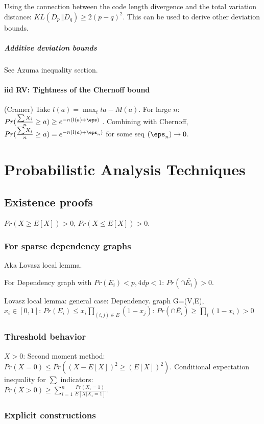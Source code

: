 \documentclass[oneside, article]{memoir}
\begin{document}
Using the connection between the code length divergence and the total variation distance: $KL(D_p||D_q) \geq 2(p-q)^{2}$. This can be used to derive other deviation bounds.

\subsubsection{Additive deviation bounds}
See Azuma inequality section.

\subsection{iid RV: Tightness of the Chernoff bound}
(Cramer) Take $l(a) = \max_{t} ta-M(a)$. For large $n$: $Pr(\frac{\sum X_{i}}{n}\geq a) \geq e^{-n(l(a) + \eps)}$ \why. Combining with Chernoff, $Pr(\frac{\sum X_{i}}{n}\geq a) = e^{-n(l(a) + \eps_{n})}$ for some seq $(\eps_{n}) \to 0$.

\part{Probabilistic Analysis Techniques}
\chapter{Existence proofs}
$Pr(X\geq E[X])>0$, $Pr(X\leq E[X])>0$.

\section{For sparse dependency graphs}
Aka Lovasz local lemma.

For Dependency graph with $Pr(E_{i})<p, 4dp<1$: $Pr(\cap \bar{E_{i}}) > 0$.

Lovasz local lemma: general case: Dependency. graph G=(V,E), \\
$x_{i} \in [0,1]$: $Pr(E_{i}) \leq x_{i} \prod_{(i,j) \in E}(1-x_{j})$: $Pr(\cap \bar{E_{i}})\geq \prod_{i}(1-x_{i}) > 0$

\section{Threshold behavior}
$X>0$: Second moment method: $Pr(X=0)\leq Pr((X-E[X])^{2} \geq (E[X])^{2})$. Conditional expectation inequality for $\sum$ indicators: \\
$Pr(X>0) \geq \sum_{i=1}^{n}\frac{Pr(X_{i}=1)}{E[X|X_{i}=1]}$.

\section{Explicit constructions}
\tbc
\end{document}
